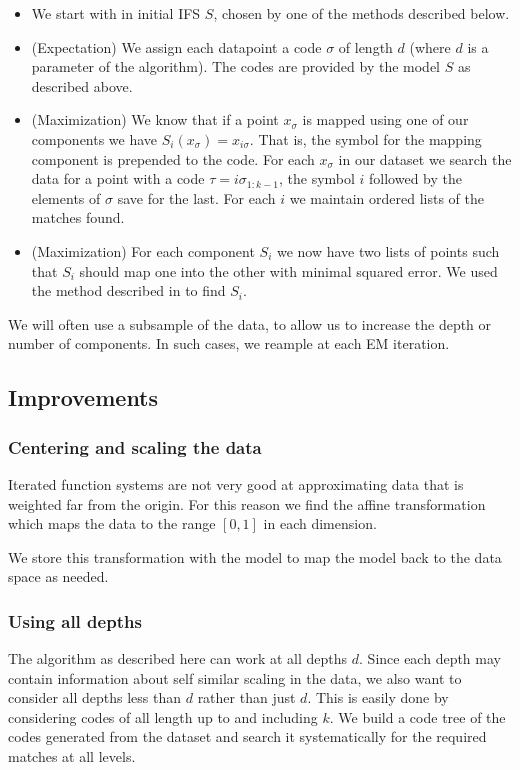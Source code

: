 \documentclass[10pt,a4paper,oneside]{article}
\theoremstyle{definition}
\begin{document}
\begin{itemize}
\item We start with in initial IFS $S$, chosen by one of the methods described below. 
\item (Expectation) We assign each datapoint a code $\sigma$ of length $d$ (where $d$ is a parameter of the algorithm). The codes are provided by the model $S$ as described above. 
\item (Maximization) We know that if a point $x_\sigma$ is mapped using one of our components we have $S_i(x_\sigma) = x_{i\sigma}$. That is, the symbol for the mapping component is prepended to the code. For each $x_\sigma$ in our dataset we search the data for a point with a code $\tau = i\sigma_{1:k-1}$, the symbol $i$ followed by the elements of $\sigma$ save for the last. For each $i$ we maintain ordered lists of the matches found.
\item (Maximization) For each component $S_i$ we now have two lists of points such that $S_i$ should map one into the other with minimal squared error. We used the method described in \cite{umeyama1991least} to find $S_i$. 
\end{itemize}

We will often use a subsample of the data, to allow us to increase the depth or number of components. In such cases, we reample at each EM iteration.
 
\subsection*{Improvements}

\subsubsection*{Centering and scaling the data}

Iterated function systems are not very good at approximating data that is weighted far from the origin. For this reason we find the affine transformation which maps the data to the range $[0,1]$ in each dimension.

We store this transformation with the model to map the model back to the data space as needed.

\subsubsection*{Using all depths}

The algorithm as described here can work at all depths $d$. Since each depth may contain information about self similar scaling in the data, we also want to consider all depths less than $d$ rather than just $d$. This is easily done by considering codes of all length up to and including $k$. We build a code tree of the codes generated from the dataset and search it systematically for the required matches at all levels.
\end{document}
